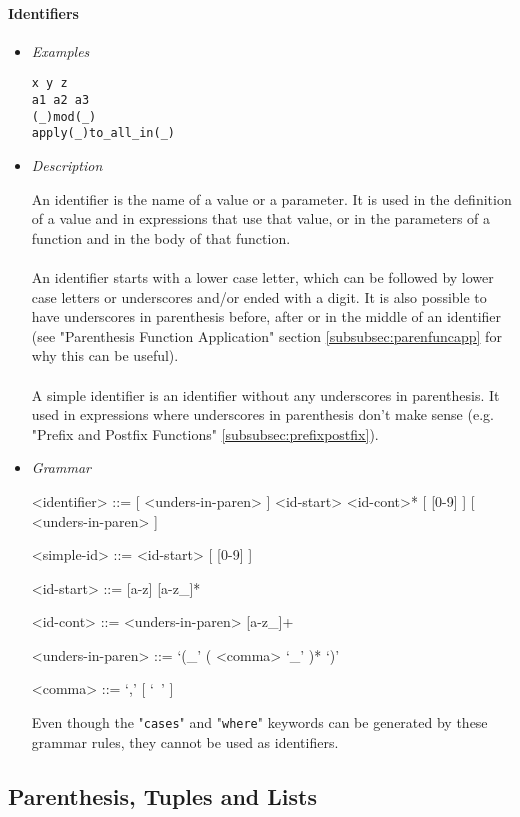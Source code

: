 \documentclass[diploma]{softlab-thesis}
\begin{document}
\paragraph{Identifiers}
\begin{itemize}

\item \textit{Examples}
\begin{verbatim}
x y z
a1 a2 a3
(_)mod(_)
apply(_)to_all_in(_)
\end{verbatim}

\item \textit{Description}

An identifier is the name of a value or a parameter. It is used in the
definition of a value and in expressions that use that value, or in the
parameters of a function and in the body of that function.
\\\\
An identifier starts with a lower case letter, which can be followed by lower
case letters or underscores and/or ended with a digit. It is also possible to
have underscores in parenthesis before, after or in the middle of an identifier
(see "Parenthesis Function Application" section \ref{subsubsec:parenfuncapp}
for why this can be useful).
\\\\
A simple identifier is an identifier without any underscores in parenthesis.
It used in expressions where underscores in parenthesis don't make sense (e.g.
"Prefix and Postfix Functions" \ref{subsubsec:prefixpostfix}).

\newpage
\item \textit{Grammar}
\begin{grammar}
<identifier> ::=
[ <unders-in-paren> ] <id-start> <id-cont>* [ [0-9] ] [ <unders-in-paren> ]

<simple-id> ::= <id-start> [ [0-9] ]

<id-start> ::= [a-z] [a-z_]*

<id-cont> ::= <unders-in-paren> [a-z_]+

<unders-in-paren> ::= `(_' ( <comma> `_' )* `)'

<comma> ::= `,' [ `\ ' ]
\end{grammar}
Even though the "\verb|cases|" and "\verb|where|" keywords can be generated
by these grammar rules, they cannot be used as identifiers.

\end{itemize}

\newpage
\subsection{Parenthesis, Tuples and Lists}
\end{document}

